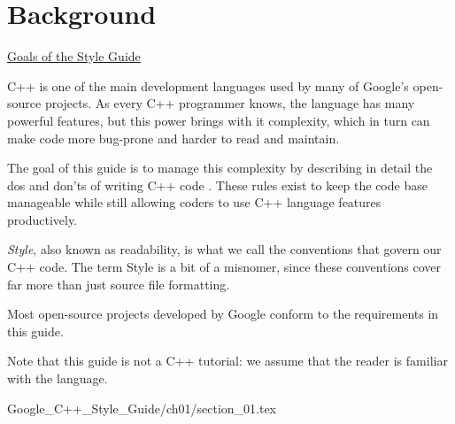 
\chapter{Background}\label{ch:background}

\begin{introduction}
    \item \hyperref[sec:goals-of-the-style-guide]{Goals of the Style Guide}
\end{introduction}

C++ is one of the main development languages used by many of Google\rq s open-source projects. As every C++ programmer knows, the language has many powerful features, but this power brings with it complexity, which in turn can make code more bug-prone and harder to read and maintain.

The goal of this guide is to manage this complexity by describing in detail the dos and don\rq ts of writing C++ code . These rules exist to keep the code base manageable while still allowing coders to use C++ language features productively.

\emph{Style}, also known as readability, is what we call the conventions that govern our C++ code. The term Style is a bit of a misnomer, since these conventions cover far more than just source file formatting.

Most open-source projects developed by Google conform to the requirements in this guide.

Note that this guide is not a C++ tutorial: we assume that the reader is familiar with the language.

{Google_C++_Style_Guide/ch01/section_01.tex}